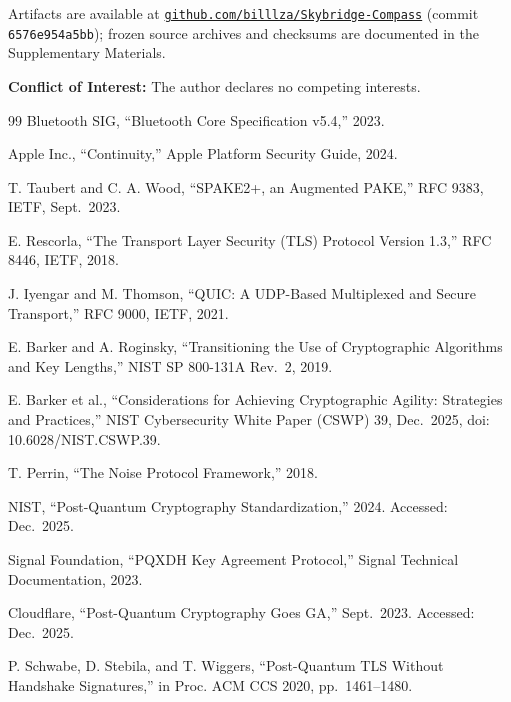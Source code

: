 \documentclass[10pt,journal,compsoc]{IEEEtran}
\newcommand{\artifacturl}{https://github.com/billlza/Skybridge-Compass}
\newcommand{\artifactsha}{6576e954a5bb}
\begin{document}
\noindent Artifacts are available at
\href{\artifacturl}{\nolinkurl{github.com/billlza/Skybridge-Compass}}
(commit \texttt{\artifactsha}); frozen source archives and checksums are
documented in the Supplementary Materials.

\noindent\textbf{Conflict of Interest:} The author declares no competing interests.


\begin{thebibliography}{99}
 Bluetooth SIG, ``Bluetooth Core Specification v5.4,'' 2023.

 Apple Inc., ``Continuity,'' Apple Platform Security Guide, 2024.

 T. Taubert and C. A. Wood, ``SPAKE2+, an Augmented PAKE,'' RFC 9383, IETF, Sept.~2023.

 E. Rescorla, ``The Transport Layer Security (TLS) Protocol Version 1.3,'' RFC 8446, IETF, 2018.

 J. Iyengar and M. Thomson, ``QUIC: A UDP-Based Multiplexed and Secure Transport,'' RFC 9000, IETF, 2021.

 E. Barker and A. Roginsky, ``Transitioning the Use of Cryptographic Algorithms and Key Lengths,'' NIST SP 800-131A Rev.~2, 2019.

 E. Barker et al., ``Considerations for Achieving Cryptographic Agility: Strategies and Practices,'' NIST Cybersecurity White Paper (CSWP) 39, Dec.~2025, doi: 10.6028/NIST.CSWP.39.

 T. Perrin, ``The Noise Protocol Framework,'' 2018.

 NIST, ``Post-Quantum Cryptography Standardization,'' 2024. Accessed: Dec.~2025.

 Signal Foundation, ``PQXDH Key Agreement Protocol,'' Signal Technical Documentation, 2023.

 Cloudflare, ``Post-Quantum Cryptography Goes GA,'' Sept.~2023. Accessed: Dec.~2025.

 P. Schwabe, D. Stebila, and T. Wiggers, ``Post-Quantum TLS Without Handshake Signatures,'' in Proc. ACM CCS 2020, pp.~1461--1480.


\end{thebibliography}
\end{document}

